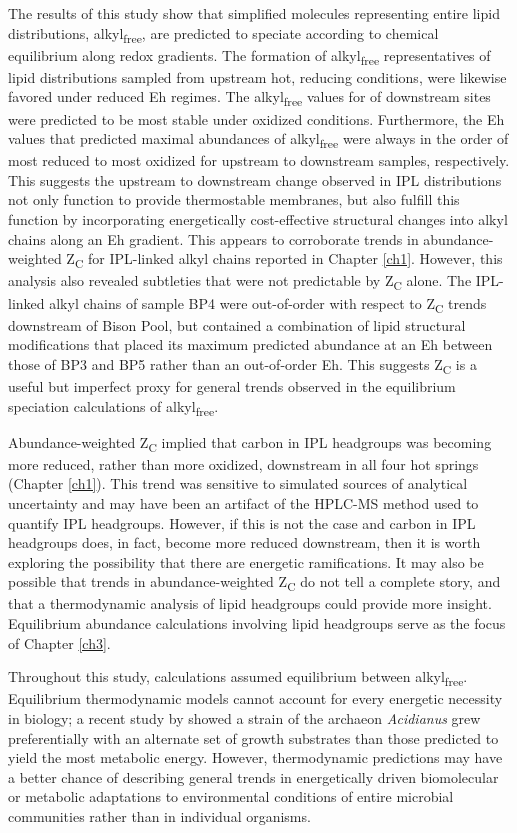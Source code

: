 The results of this study show that simplified molecules representing entire lipid distributions, alkyl\textsubscript{free}, are predicted to speciate according to chemical equilibrium along redox gradients. The formation of alkyl\textsubscript{free} representatives of lipid distributions sampled from upstream hot, reducing conditions, were likewise favored under reduced Eh regimes. The alkyl\textsubscript{free} values for of downstream sites were predicted to be most stable under oxidized conditions. Furthermore, the Eh values that predicted maximal abundances of alkyl\textsubscript{free} were always in the order of most reduced to most oxidized for upstream to downstream samples, respectively. This suggests the upstream to downstream change observed in IPL distributions not only function to provide thermostable membranes, but also fulfill this function by incorporating energetically cost-effective structural changes into alkyl chains along an Eh gradient. This appears to corroborate trends in abundance-weighted Z\textsubscript{C} for IPL-linked alkyl chains reported in Chapter \ref{ch1}. However, this analysis also revealed subtleties that were not predictable by Z\textsubscript{C} alone. The IPL-linked alkyl chains of sample BP4 were out-of-order with respect to Z\textsubscript{C} trends downstream of Bison Pool, but contained a combination of lipid structural modifications that placed its maximum predicted abundance at an Eh between those of BP3 and BP5 rather than an out-of-order Eh. This suggests Z\textsubscript{C} is a useful but imperfect proxy for general trends observed in the equilibrium speciation calculations of alkyl\textsubscript{free}.


Abundance-weighted Z\textsubscript{C} implied that carbon in IPL headgroups was becoming more reduced, rather than more oxidized, downstream in all four hot springs (Chapter \ref{ch1}). This trend was sensitive to simulated sources of analytical uncertainty and may have been an artifact of the HPLC-MS method used to quantify IPL headgroups. However, if this is not the case and carbon in IPL headgroups does, in fact, become more reduced downstream, then it is worth exploring the possibility that there are energetic ramifications. It may also be possible that trends in abundance-weighted Z\textsubscript{C} do not tell a complete story, and that a thermodynamic analysis of lipid headgroups could provide more insight. Equilibrium abundance calculations involving lipid headgroups serve as the focus of Chapter \ref{ch3}.

Throughout this study, calculations assumed equilibrium between alkyl\textsubscript{free}. Equilibrium thermodynamic models cannot account for every energetic necessity in biology; a recent study by \cite{amenabar2017microbial} showed a strain of the archaeon \textit{Acidianus} grew preferentially with an alternate set of growth substrates than those predicted to yield the most metabolic energy. However, thermodynamic predictions may have a better chance of describing general trends in energetically driven biomolecular or metabolic adaptations to environmental conditions of entire microbial communities rather than in individual organisms.

